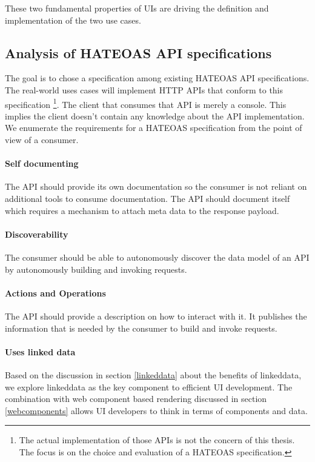 These two fundamental properties of UIs are driving the definition and implementation of the two use cases.

\subsection{Analysis of HATEOAS API specifications}\label{sec:analysishateoas}
The goal is to chose a specification among existing HATEOAS API specifications. The real-world uses cases will implement HTTP APIs that conform to this specification \footnote{The actual implementation of those APIs is not the concern of this thesis. The focus is on the choice and evaluation of a HATEOAS specification.}. The client that consumes that API is merely a \gls{console}. This implies the client doesn't contain any knowledge about the API implementation. \\
We enumerate the requirements for a HATEOAS specification from the point of view of a consumer.

\paragraph{Self documenting}
The API should provide its own documentation so the consumer is not reliant on additional tools to consume documentation. The API should document itself which requires a mechanism to attach meta data to the response payload.

\paragraph{Discoverability}
The consumer should be able to autonomously discover the data model of an API by autonomously building and invoking requests.

\paragraph{Actions and Operations}
The API should provide a description on how to interact with it. It publishes the information that is needed by the consumer to build and invoke requests.

\paragraph{Uses linked data}
Based on the discussion in section \ref{linkeddata} about the benefits of \gls{linkeddata}, we explore \gls{linkeddata} as the key component to efficient UI development. The combination with web component based rendering discussed in section \ref{webcomponents} allows UI developers to think in terms of components and data.

